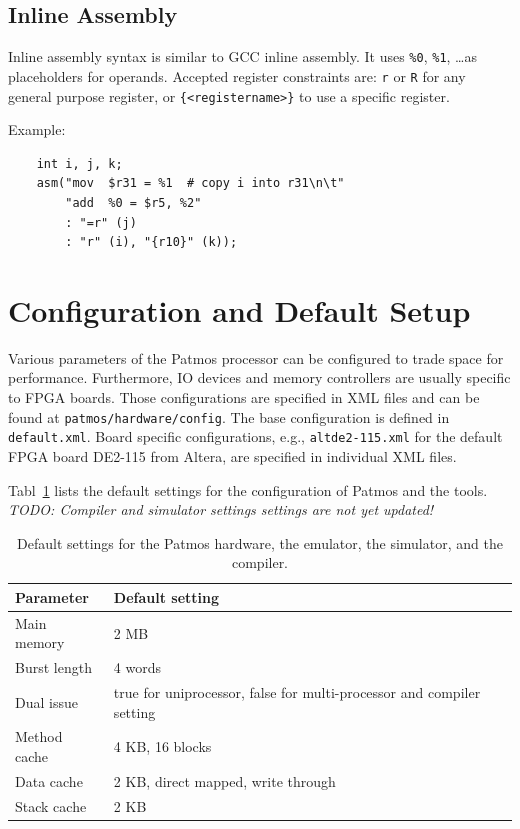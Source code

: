 \documentclass[a4paper,fontsize=10pt,twoside,DIV15,BCOR12mm,headinclude=true,footinclude=false,pagesize,bibtotoc]{scrbook}
\newcommand{\code}[1]{{\texttt{#1}}}
\newcommand{\todo}[1]{{\emph{TODO: #1}}}
\begin{document}
\subsection{Inline Assembly}

Inline assembly syntax is similar to GCC inline assembly. It uses \texttt{\%0}, \texttt{\%1}, \dots as placeholders
for operands. Accepted register constraints are: \texttt{r} or \texttt{R} for any general purpose register, or
\texttt{\{<registername>\}} to use a specific register.

Example:
\begin{lstlisting}
    int i, j, k;
    asm("mov  $r31 = %1  # copy i into r31\n\t"
        "add  %0 = $r5, %2"
        : "=r" (j)
        : "r" (i), "{r10}" (k));
\end{lstlisting}

\section{Configuration and Default Setup}

Various parameters of the Patmos processor can be configured to trade
space for performance. Furthermore, IO devices and memory controllers
are usually specific to FPGA boards. Those configurations are specified in
XML files and can be found at \code{patmos/hardware/config}. The base
configuration is defined in \code{default.xml}. Board specific configurations,
e.g., \code{altde2-115.xml} for the default FPGA board DE2-115 from Altera,
are specified in individual XML files.

Tabl~\ref{tab:defaults} lists the default settings for the configuration of Patmos
and the tools. \todo{Compiler and simulator settings settings are not yet updated!}

\begin{table}
\centering
\begin{tabular}{ll}
\toprule
Parameter & Default setting \\
\midrule
Main memory & 2 MB \\
Burst length & 4 words \\
Dual issue & true for uniprocessor, false for multi-processor and compiler setting \\
Method cache & 4 KB, 16 blocks \\
Data cache & 2 KB, direct mapped, write through \\
Stack cache & 2 KB \\
\bottomrule
\end{tabular}
\caption{Default settings for the Patmos hardware, the emulator, the simulator, and the compiler.}
\label{tab:defaults}
\end{table}
\end{document}
